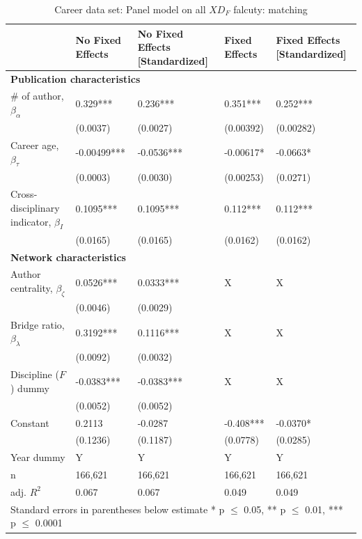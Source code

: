 \documentclass[10pt]{article}          %
\begin{document}
\begin{table}[H]
\begin{tabular}{m{5cm} m{3.0cm} m{3cm} m{2.5cm} m{2.7cm}}
\hline
\hline
& \textbf{No Fixed Effects} & \textbf{No Fixed Effects [Standardized]} & \textbf{Fixed Effects} & \textbf{Fixed Effects [Standardized]} \\ \hline
\multicolumn{5}{l}{\textbf{Publication characteristics}} \\
\rowcolor{lightgray}
{\# of author, $\beta_\alpha$} & 0.329***  & 0.236*** & 0.351*** & 0.252*** \\
                             & (0.0037) & (0.0027) & (0.00392) & (0.00282) \\
\rowcolor{lightgray}
{Career age, $\beta_\tau$} & -0.00499*** & -0.0536*** & -0.00617* & -0.0663* \\
                         & (0.0003) & (0.0030) & (0.00253) & (0.0271) \\
\rowcolor{lightgray}
{Cross-disciplinary indicator, $\beta_I$} & 0.1095*** & 0.1095*** &  0.112*** & 0.112*** \\
                                        & (0.0165) & (0.0165) & (0.0162) & (0.0162) \\ \hline
\multicolumn{5}{l}{\textbf{Network characteristics}} \\
\rowcolor{lightgray}
{Author centrality, $\beta_\zeta$} & 0.0526*** & 0.0333*** & X & X \\
                             & (0.0046) & (0.0029) &  &  \\
\rowcolor{lightgray}
{Bridge ratio, $\beta_\lambda$} & 0.3192*** & 0.1116*** & X & X \\
                             & (0.0092) & (0.0032) & & \\
\rowcolor{lightgray}
{Discipline ($F$) dummy}     & -0.0383*** & -0.0383*** & X & X \\
                             & (0.0052) & (0.0052) & & \\
\rowcolor{lightgray}
{Constant}                 & 0.2113 & -0.0287 & -0.408*** & -0.0370* \\
                         & (0.1236) & (0.1187) & (0.0778) & (0.0285) \\
\rowcolor{lightgray}
{Year dummy}            & Y & Y & Y & Y \\ \hline
\rowcolor{lightgray}
{n}                      & 166,621 & 166,621 & 166,621 & 166,621 \\
\rowcolor{lightgray}
{adj. $R^2$}             & 0.067 & 0.067 & 0.049 & 0.049 \\ \hline \hline
\multicolumn{5}{l}{\footnotesize{Standard errors in parentheses below estimate * p $\leq$ 0.05, ** p $\leq$ 0.01, *** p $\leq$ 0.0001}}

\end{tabular}
\caption{Career data set: Panel model on all $XD_F$ falcuty: matching}
\label{tbl:sT6}
\end{table}
\end{document}
